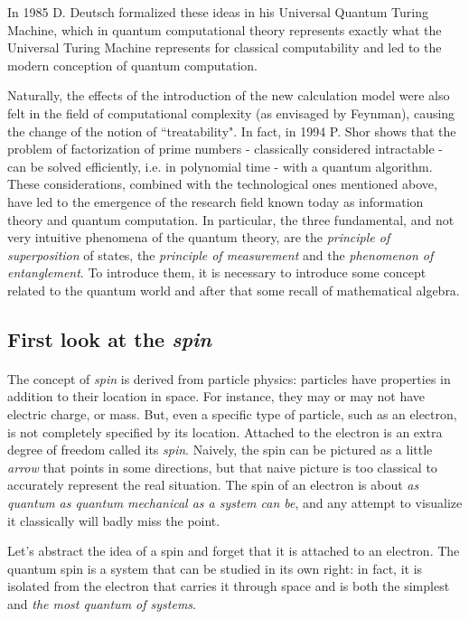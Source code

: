 \documentclass[a4paper,10pt]{article}
\begin{document}
In 1985 D. Deutsch formalized these ideas in his Universal Quantum Turing Machine, which in quantum computational theory represents exactly what the Universal Turing Machine represents for classical computability and led to the modern conception of quantum computation.

Naturally, the effects of the introduction of the new calculation model were also felt in the field of computational complexity (as envisaged by Feynman), causing the change of the notion of ``treatability". In fact, in 1994 P. Shor shows that the problem of factorization of prime numbers - classically considered intractable - can be solved efficiently, i.e. in polynomial time - with a quantum algorithm. These considerations, combined with the technological ones mentioned above, have led to the emergence of the research field known today as information theory and quantum computation. In particular, the three fundamental, and not very intuitive phenomena of the quantum theory, are the \textit{principle of superposition} of states, the \textit{principle of measurement} and the \textit{phenomenon of entanglement}. To introduce them, it is necessary to introduce some concept related to the quantum world and after that some recall of mathematical algebra.

\subsection{First look at the \textit{spin}}
\label{subsec:spinExample}
\paragraph{} The concept of \textit{spin} is derived from particle physics: particles have properties in addition to their location in space. For instance, they may or may not have electric charge, or mass. But, even a specific type of particle, such as an electron, is not completely specified by its location. Attached to the electron is an extra degree of freedom called its \textit{spin}. Naively, the spin can be pictured as a little \textit{arrow} that points in some directions, but that naive picture is too classical to accurately represent the real situation. The spin of an electron is about \textit{as quantum as quantum mechanical as a system can be}, and any attempt to visualize it classically will badly miss the point.

Let's abstract the idea of a spin and forget that it is attached to an electron. The quantum spin is a system that can be studied in its own right: in fact, it is isolated from the electron that carries it through space and is both the simplest and \textit{the most quantum of systems}.
\end{document}
